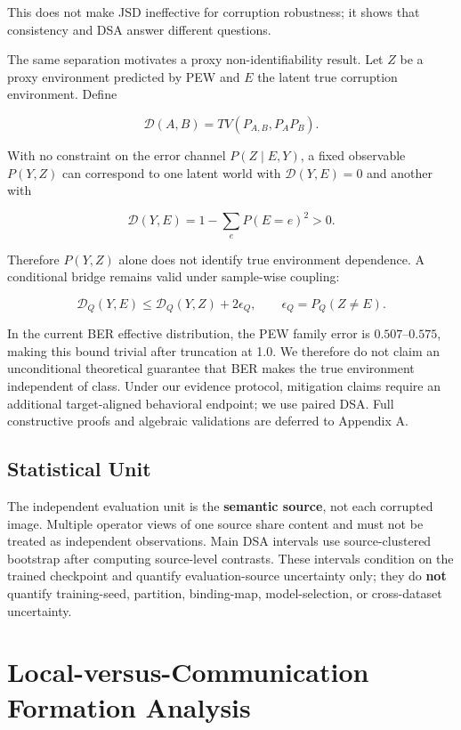 \documentclass[10pt,twocolumn]{article}
\begin{document}
This does not make JSD ineffective for corruption robustness; it shows that consistency and DSA answer different questions.

The same separation motivates a proxy non-identifiability result. Let \(Z\) be a proxy environment predicted by PEW and \(E\) the latent true corruption environment. Define

\[
\mathcal D(A,B)=TV(P_{A,B},P_AP_B).
\]

With no constraint on the error channel \(P(Z\mid E,Y)\), a fixed observable \(P(Y,Z)\) can correspond to one latent world with \(\mathcal D(Y,E)=0\) and another with

\[
\mathcal D(Y,E)=1-\sum_eP(E=e)^2>0.
\]

Therefore \(P(Y,Z)\) alone does not identify true environment dependence. A conditional bridge remains valid under sample-wise coupling:

\[
\mathcal D_Q(Y,E)\le
\mathcal D_Q(Y,Z)+2\epsilon_Q,
\qquad
\epsilon_Q=P_Q(Z\neq E).
\]

In the current BER effective distribution, the PEW family error is \(0.507\)--\(0.575\), making this bound trivial after truncation at 1.0. We therefore do not claim an unconditional theoretical guarantee that BER makes the true environment independent of class. Under our evidence protocol, mitigation claims require an additional target-aligned behavioral endpoint; we use paired DSA. Full constructive proofs and algebraic validations are deferred to Appendix A.

\subsection{Statistical Unit}

The independent evaluation unit is the \textbf{semantic source}, not each corrupted image. Multiple operator views of one source share content and must not be treated as independent observations. Main DSA intervals use source-clustered bootstrap after computing source-level contrasts. These intervals condition on the trained checkpoint and quantify evaluation-source uncertainty only; they do \textbf{not} quantify training-seed, partition, binding-map, model-selection, or cross-dataset uncertainty.

\section{Local-versus-Communication Formation Analysis}
\end{document}
